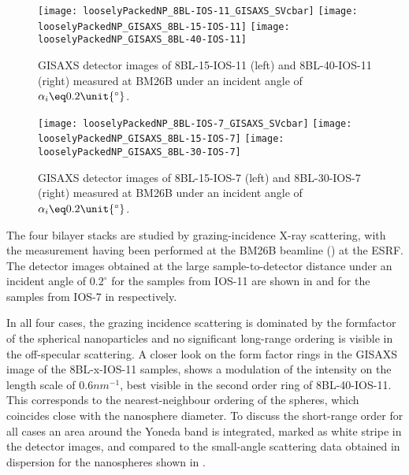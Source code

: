 \documentclass[\main/dresen_thesis.tex]{subfiles}
\begin{document}
  \label{sec:looselyPackedNS:bilayerStacks:gisaxs}
  \begin{figure}[tb]
    \centering
    \texttt{[image: looselyPackedNP\_8BL-IOS-11\_GISAXS\_SVcbar]}
    \texttt{[image: looselyPackedNP\_GISAXS\_8BL-15-IOS-11]}
    \texttt{[image: looselyPackedNP\_GISAXS\_8BL-40-IOS-11]}
    \caption{\label{fig:looselyPackedNP:bilayerStacks:gisaxs8BL_IOS_11}GISAXS detector images of 8BL-15-IOS-11 (left)  and 8BL-40-IOS-11 (right) measured at BM26B under an incident angle of $\alpha_i \eq 0.2 \unit{^\circ}$.}
  \end{figure}

  \begin{figure}[tb]
    \centering
    \texttt{[image: looselyPackedNP\_8BL-IOS-7\_GISAXS\_SVcbar]}
    \texttt{[image: looselyPackedNP\_GISAXS\_8BL-15-IOS-7]}
    \texttt{[image: looselyPackedNP\_GISAXS\_8BL-30-IOS-7]}
    \caption{\label{fig:looselyPackedNP:bilayerStacks:gisaxs8BL_IOS_7}GISAXS detector images of 8BL-15-IOS-7 (left)  and 8BL-30-IOS-7 (right) measured at BM26B under an incident angle of $\alpha_i \eq 0.2 \unit{^\circ}$.}
  \end{figure}

  The four bilayer stacks are studied by grazing-incidence X-ray scattering, with the measurement having been performed at the BM26B beamline () at the ESRF.
  The detector images obtained at the large sample-to-detector distance under an incident angle of $0.2 ^\circ$ for the samples from IOS-11 are shown in  and for the samples from IOS-7 in  respectively.

  In all four cases, the grazing incidence scattering is dominated by the formfactor of the spherical nanoparticles and no significant long-range ordering is visible in the off-specular scattering.
  A closer look on the form factor rings in the GISAXS image of the 8BL-x-IOS-11 samples, shows a modulation of the intensity on the length scale of $0.6 \unit{nm^{-1}}$, best visible in the second order ring of 8BL-40-IOS-11.
  This corresponds to the nearest-neighbour ordering of the spheres, which coincides close with the nanosphere diameter.
  To discuss the short-range order for all cases an area around the Yoneda band is integrated, marked as white stripe in the detector images, and compared to the small-angle scattering data obtained in dispersion for the nanospheres shown in .
\end{document}

